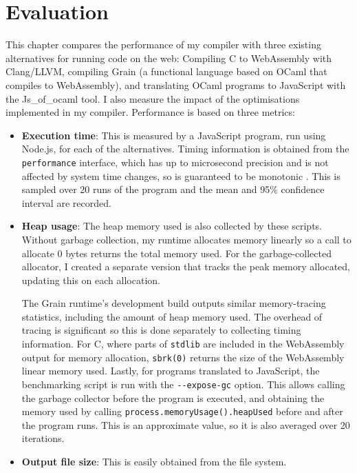 \chapter{Evaluation}
This chapter compares the performance of my compiler with three existing alternatives for running code on the web: Compiling C to WebAssembly with Clang/LLVM, compiling Grain (a functional language based on OCaml that compiles to WebAssembly), and translating OCaml programs to JavaScript with the Js\_of\_ocaml tool.
I also measure the impact of the optimisations implemented in my compiler. Performance is based on three metrics: 

\begin{itemize}
\item \textbf{Execution time}: This is measured by a JavaScript program, run using Node.js, for each of the alternatives. Timing information is obtained from the \verb|performance| interface, which has up to microsecond precision and is not affected by system time changes, so is guaranteed to be monotonic \cite{timing}. This is sampled over 20 runs of the program and the mean and 95\% confidence interval are recorded. 

\item \textbf{Heap usage}: The heap memory used is also collected by these scripts. Without garbage collection, my runtime allocates memory linearly so a call to allocate 0 bytes returns the total memory used. For the garbage-collected allocator, I created a separate version that tracks the peak memory allocated, updating this on each allocation. 

The Grain runtime's development build outputs similar memory-tracing statistics, including the amount of heap memory used. 
The overhead of tracing is significant so this is done separately to collecting timing information. For C, where parts of \verb|stdlib| are included in the WebAssembly output for memory allocation, \verb|sbrk(0)| returns the size of the WebAssembly linear memory used. 
Lastly, for programs translated to JavaScript, the benchmarking script is run with the \verb|--expose-gc| option. This allows calling the garbage collector before the program is executed, and obtaining the memory used by calling \verb|process.memoryUsage().heapUsed| before and after the program runs. This is an approximate value, so it is also averaged over 20 iterations.

\item \textbf{Output file size}: This is easily obtained from the file system.

\end{itemize}

